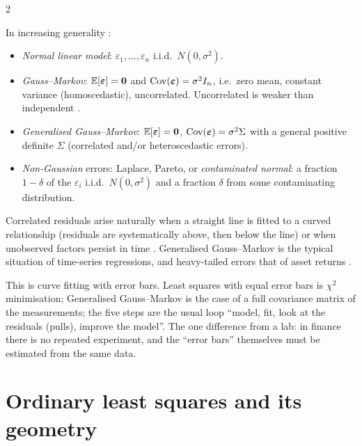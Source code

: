 \begin{paracol}{2}
\begin{definition}\label{ch05:def-assumptions}
In increasing generality  :
\begin{itemize}
  \item \emph{Normal linear model}: $\varepsilon_1,\dots,\varepsilon_n$ i.i.d.\ $N(0,\sigma^2)$.
  \item \emph{Gauss--Markov}: $\mathbb{E}[\bm\varepsilon]=\bm 0$ and $\operatorname{Cov}(\bm\varepsilon)=\sigma^2I_n$, i.e.\ zero mean,
        constant variance (homoscedastic), uncorrelated. Uncorrelated is weaker than independent
        .
  \item \emph{Generalised Gauss--Markov}: $\mathbb{E}[\bm\varepsilon]=\bm 0$, $\operatorname{Cov}(\bm\varepsilon)=\sigma^2\Sigma$ with a general
        positive definite $\Sigma$ (correlated and/or heteroscedastic errors).
  \item \emph{Non-Gaussian} errors: Laplace, Pareto, or \emph{contaminated normal}: a fraction $1-\delta$ of the
        $\varepsilon_i$ i.i.d.\ $N(0,\sigma^2)$ and a fraction $\delta$ from some contaminating distribution.
\end{itemize}
\end{definition}
Correlated residuals arise naturally when a straight line is fitted to a curved relationship
(residuals are systematically above, then below the line) or when unobserved factors persist in time
. Generalised Gauss--Markov is the typical situation of time-series regressions, and
heavy-tailed errors that of asset returns .

\begin{intuition}
This is curve fitting with error bars. Least squares with equal error bars is $\chi^2$ minimisation;
Generalised Gauss--Markov is the case of a full covariance matrix of the measurements; the five steps are
the usual loop ``model, fit, look at the residuals (pulls), improve the model''. The one difference from a
lab: in finance there is no repeated experiment, and the ``error bars'' themselves must be estimated from
the same data.
\end{intuition}

\section{Ordinary least squares and its geometry}\label{ch05:sec-ols}


\end{paracol}
